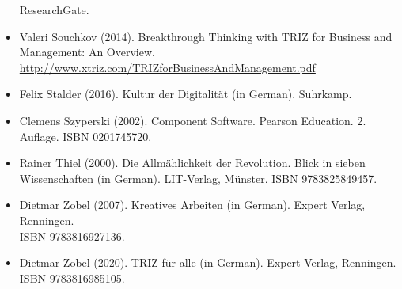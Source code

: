 \documentclass[11pt,a4paper]{article}
\begin{document}
\begin{itemize}
  ResearchGate.
\item Valeri Souchkov (2014).  Breakthrough Thinking with TRIZ for Business
  and Management: An Overview.
  \url{http://www.xtriz.com/TRIZforBusinessAndManagement.pdf}
\item Felix Stalder (2016). Kultur der Digitalität (in German). Suhrkamp.
\item Clemens Szyperski (2002). Component Software. Pearson Education.
  2. Auflage.  ISBN 0201745720.
\item Rainer Thiel (2000). Die Allmählichkeit der Revolution. Blick in sieben
  Wissenschaften (in German).  LIT-Verlag, Münster. ISBN 9783825849457.
\item Dietmar Zobel (2007). Kreatives Arbeiten (in German). Expert Verlag,
  Renningen.\\ ISBN 9783816927136.
\item Dietmar Zobel (2020). TRIZ für alle (in German). Expert Verlag,
  Renningen. ISBN 9783816985105.
\end{itemize}
\end{document}
